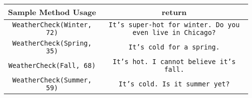 \documentclass[12pt]{article}
\begin{document}
\begin{center}
\begin{tabular}{| c | c |}
\hline\rule{0pt}{4ex}
Sample Method Usage & return \\
\hline\rule{0pt}{4ex}
\texttt{WeatherCheck(Winter, 72)} & \texttt{It's super-hot for winter. Do you even live in Chicago?}\\
\hline\rule{0pt}{4ex}
\texttt{WeatherCheck(Spring, 35)} & \texttt{It's cold for a spring.}\\
\hline\rule{0pt}{4ex}
\texttt{WeatherCheck(Fall, 68)} & \texttt{It's hot. I cannot believe it's fall.}\\
\hline\rule{0pt}{4ex}
\texttt{WeatherCheck(Summer, 59)} & \texttt{It's cold. Is it summer yet?}\\
\hline
\end{tabular}
\end{center}
\end{document}
